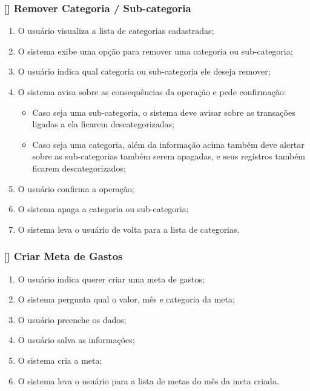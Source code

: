 \documentclass[a4paper]{abnt}
\begin{document}
\subsubsection{[\UC] Remover Categoria / Sub-categoria}
\begin{enumerate}[itemsep=-1ex]
	\item O usuário visualiza a lista de categorias cadastradas;
	\item O sistema exibe uma opção para remover uma categoria ou sub-categoria;
	\item O usuário indica qual categoria ou sub-categoria ele deseja remover;
	\item O sistema avisa sobre as consequ\^encias da operaç\~ao e pede confirmaç\~ao:
	\begin{itemize}[itemsep=-1ex,topsep=-1ex]
		\item Caso seja uma sub-categoria, o sistema deve avisar sobre as transaç\~oes ligadas a ela ficarem descategorizadas;
		\item Caso seja uma categoria, além da informaç\~ao acima também deve alertar sobre as sub-categorias também serem apagadas, e seus registros também ficarem descategorizados;
	\end{itemize}
	\item O usuário confirma a operaç\~ao;
	\item O sistema apaga a categoria ou sub-categoria;
	\item O sistema leva o usuário de volta para a lista de categorias.
\end{enumerate}

\subsubsection{[\UC] Criar Meta de Gastos}
\begin{enumerate}[itemsep=-1ex]
	\item O usuário indica querer criar uma meta de gastos;
	\item O sistema pergunta qual o valor, m\^es e categoria da meta;
	\item O usuário preenche os dados;
	\item O usuário salva as informaç\~oes;
	\item O sistema cria a meta;
	\item O sistema leva o usuário para a lista de metas do m\^es da meta criada.
\end{enumerate}
\end{document}
